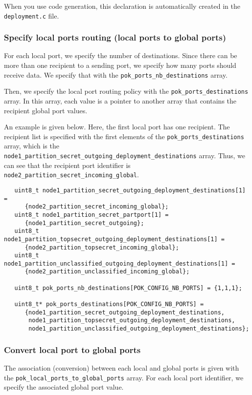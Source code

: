    When you use code generation, this declaration is
   automatically created in the \texttt{deployment.c} file.


   \subsubsection{Specify local ports routing (local ports to global ports)}
   For each local port, we specify the number of destinations. Since there can
   be more than one recipient to a sending port, we specify how many ports
   should receive data. We specify that with the
   \texttt{pok\_ports\_nb\_destinations} array.

   Then, we specify the local port routing policy with the
   \texttt{pok\_ports\_destinations} array. In this array, each value is a
   pointer to another array that contains the recipient global port values.

   An example is given below. Here, the first local port has one recipient. The
   recipient list is specified with the first elements of the
   \texttt{pok\_ports\_destinations} array, which is the
   \texttt{node1\_partition\_secret\_outgoing\_deployment\_destinations} array.
   Thus, we can see that the recipient port identifier is
   \texttt{node2\_partition\_secret\_incoming\_global}.

   \begin{verbatim}
   uint8_t node1_partition_secret_outgoing_deployment_destinations[1] =
      {node2_partition_secret_incoming_global};
   uint8_t node1_partition_secret_partport[1] =
      {node1_partition_secret_outgoing};
   uint8_t node1_partition_topsecret_outgoing_deployment_destinations[1] =
      {node2_partition_topsecret_incoming_global};
   uint8_t node1_partition_unclassified_outgoing_deployment_destinations[1] =
      {node2_partition_unclassified_incoming_global};

   uint8_t pok_ports_nb_destinations[POK_CONFIG_NB_PORTS] = {1,1,1};

   uint8_t* pok_ports_destinations[POK_CONFIG_NB_PORTS] =
      {node1_partition_secret_outgoing_deployment_destinations,
       node1_partition_topsecret_outgoing_deployment_destinations,
       node1_partition_unclassified_outgoing_deployment_destinations};
   \end{verbatim}


   \subsubsection{Convert local port to global ports}
   The association (conversion) between each local and global ports is given
   with the \texttt{pok\_local\_ports\_to\_global\_ports} array. For each local
   port identifier, we specify the associated global port value.

